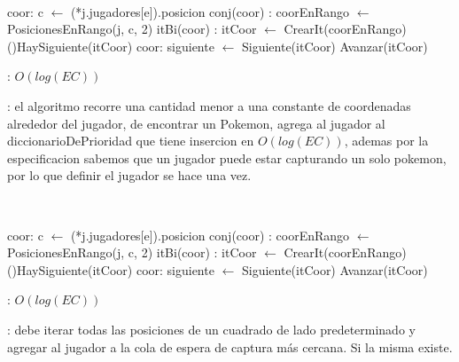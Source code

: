 \begin{Algoritmos}
	~

	\begin{algorithm}[H]
		\NoCaptionOfAlgo
		\caption{}
		\BlankLine
		coor: c $\leftarrow$ (*j.jugadores[e]).posicion
		conj(coor) : coorEnRango $\leftarrow$ PosicionesEnRango(j, c, 2)
		itBi(coor) : itCoor $\leftarrow$ CrearIt(coorEnRango)
		\While(){HaySiguiente(itCoor)}{
			coor: siguiente $\leftarrow$ Siguiente(itCoor)
			Avanzar(itCoor)
		}
	\end{algorithm}

	\complejidad: $O(log(EC))$

	\justifcomp: el algoritmo recorre una cantidad menor a una constante de coordenadas alrededor del jugador, de encontrar un Pokemon, agrega al jugador al diccionarioDePrioridad que tiene insercion en $O(log(EC))$, ademas por la especificacion sabemos que un jugador puede estar capturando un solo pokemon, por lo que definir el jugador se hace una vez.

	~

	\begin{algorithm}[H]
		\NoCaptionOfAlgo
		\caption{}
		\BlankLine
		coor: c $\leftarrow$ (*j.jugadores[e]).posicion
		conj(coor) : coorEnRango $\leftarrow$ PosicionesEnRango(j, c, 2)
		itBi(coor) : itCoor $\leftarrow$ CrearIt(coorEnRango)
		\While(){HaySiguiente(itCoor)}{
			coor: siguiente $\leftarrow$ Siguiente(itCoor)
			Avanzar(itCoor)
		}
	\end{algorithm}

	\complejidad: $O(log(EC))$

	\justifcomp: debe iterar todas las posiciones de un cuadrado de lado predeterminado y agregar al jugador a la cola de espera de captura más cercana. Si la misma existe.


\end{Algoritmos}
